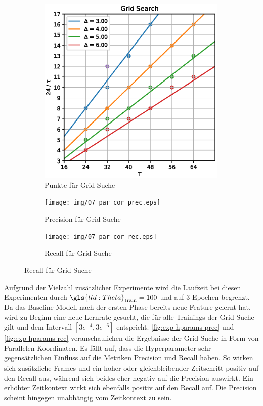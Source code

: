 \begin{figure}
    \centering
    \begin{subfigure}{.25\textwidth}
        \centering
        \includegraphics[width=0.99\textwidth, keepaspectratio, interpolate]{img/07_grid_csn.eps}
        \caption{Punkte für Grid-Suche}
        \label{fig:exp-hparams-grid}
    \end{subfigure}%
    \begin{subfigure}{.37\textwidth}
        \centering
        \texttt{[image: img/07\_par\_cor\_prec.eps]}
        \caption{Precision für Grid-Suche}
        \label{fig:exp-hparams-prec}
    \end{subfigure}
    \begin{subfigure}{.37\textwidth}
        \centering
        \texttt{[image: img/07\_par\_cor\_rec.eps]}
        \caption{Recall für Grid-Suche}
        \label{fig:exp-hparams-rec}
    \end{subfigure}
\end{figure}

Aufgrund der Vielzahl zusätzlicher Experimente wird die Laufzeit bei diesen Experimenten durch $\gls{tld:Theta}_\text{train} = 100$ und auf 3 Epochen begrenzt.
Da das Baseline-Modell nach der ersten Phase bereits neue Feature gelernt hat, wird zu Beginn eine neue Lernrate gesucht, die für alle Trainings der Grid-Suche gilt und dem Intervall $[3e^{-4}, 3e^{-6}]$ entspricht.
\autoref{fig:exp-hparams-prec} und \autoref{fig:exp-hparams-rec} veranschaulichen die Ergebnisse der Grid-Suche in Form von Parallelen Koordinaten.
Es fällt auf, dass die Hyperparameter sehr gegensätzlichen Einfluss auf die Metriken Precision und Recall haben.
So wirken sich zusätzliche Frames und ein hoher oder gleichbleibender Zeitschritt positiv auf den Recall aus, während sich beides eher negativ auf die Precision auswirkt.
Ein erhöhter Zeitkontext wirkt sich ebenfalls positiv auf den Recall auf.
Die Precision scheint hingegen unabhängig vom Zeitkontext zu sein.

